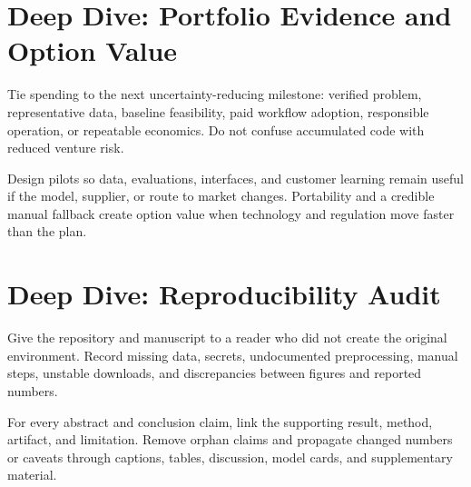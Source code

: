 \expandafter\def\csname almanachdeepdive@startup\endcsname{%
\section{Deep Dive: Portfolio Evidence and Option Value}
\begin{tcbitemize}[skin=sectionraster]
\tcbitem[title={Fund Learning Milestones},raster multicolumn=3]
Tie spending to the next uncertainty-reducing milestone: verified problem,
representative data, baseline feasibility, paid workflow adoption, responsible
operation, or repeatable economics.
Do not confuse accumulated code with reduced venture risk.

\tcbitem[title={Preserve Strategic Options},raster multicolumn=3]
Design pilots so data, evaluations, interfaces, and customer learning remain
useful if the model, supplier, or route to market changes.
Portability and a credible manual fallback create option value when technology
and regulation move faster than the plan.
\end{tcbitemize}
}

\expandafter\def\csname almanachdeepdive@scientific-writing\endcsname{%
\section{Deep Dive: Reproducibility Audit}
\begin{tcbitemize}[skin=sectionraster]
\tcbitem[title={Recompute from a Clean Environment},raster multicolumn=3]
Give the repository and manuscript to a reader who did not create the original
environment.
Record missing data, secrets, undocumented preprocessing, manual steps,
unstable downloads, and discrepancies between figures and reported numbers.

\tcbitem[title={Audit the Claim Graph},raster multicolumn=3]
For every abstract and conclusion claim, link the supporting result, method,
artifact, and limitation.
Remove orphan claims and propagate changed numbers or caveats through captions,
tables, discussion, model cards, and supplementary material.
\end{tcbitemize}
}

\newcommand{\almanachdeepdive}[1]{%
    \ifcsname almanachdeepdive@#1\endcsname
        \csname almanachdeepdive@#1\endcsname
    \fi
}
